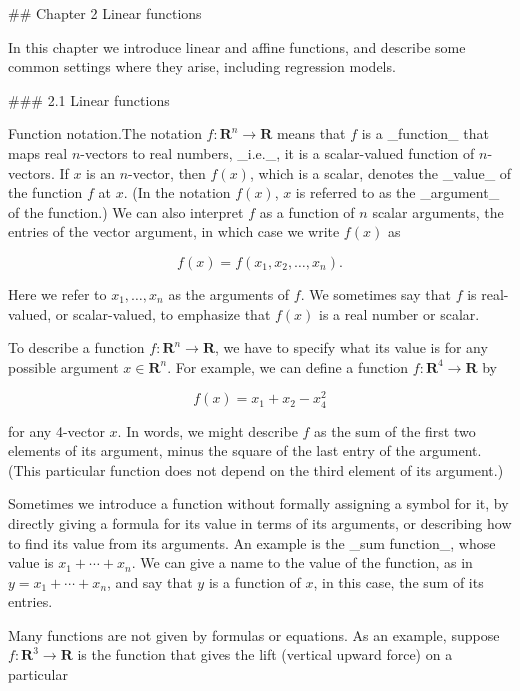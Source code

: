 

## Chapter 2 Linear functions

In this chapter we introduce linear and affine functions, and describe some common settings where they arise, including regression models.

### 2.1 Linear functions

Function notation.The notation \(f:\mathbf{R}^{n}\to\mathbf{R}\) means that \(f\) is a _function_ that maps real \(n\)-vectors to real numbers, _i.e._, it is a scalar-valued function of \(n\)-vectors. If \(x\) is an \(n\)-vector, then \(f(x)\), which is a scalar, denotes the _value_ of the function \(f\) at \(x\). (In the notation \(f(x)\), \(x\) is referred to as the _argument_ of the function.) We can also interpret \(f\) as a function of \(n\) scalar arguments, the entries of the vector argument, in which case we write \(f(x)\) as

\[f(x)=f(x_{1},x_{2},\ldots,x_{n}).\]

Here we refer to \(x_{1},\ldots,x_{n}\) as the arguments of \(f\). We sometimes say that \(f\) is real-valued, or scalar-valued, to emphasize that \(f(x)\) is a real number or scalar.

To describe a function \(f:\mathbf{R}^{n}\to\mathbf{R}\), we have to specify what its value is for any possible argument \(x\in\mathbf{R}^{n}\). For example, we can define a function \(f:\mathbf{R}^{4}\to\mathbf{R}\) by

\[f(x)=x_{1}+x_{2}-x_{4}^{2}\]

for any 4-vector \(x\). In words, we might describe \(f\) as the sum of the first two elements of its argument, minus the square of the last entry of the argument. (This particular function does not depend on the third element of its argument.)

Sometimes we introduce a function without formally assigning a symbol for it, by directly giving a formula for its value in terms of its arguments, or describing how to find its value from its arguments. An example is the _sum function_, whose value is \(x_{1}+\cdots+x_{n}\). We can give a name to the value of the function, as in \(y=x_{1}+\cdots+x_{n}\), and say that \(y\) is a function of \(x\), in this case, the sum of its entries.

Many functions are not given by formulas or equations. As an example, suppose \(f:\mathbf{R}^{3}\to\mathbf{R}\) is the function that gives the lift (vertical upward force) on a particular